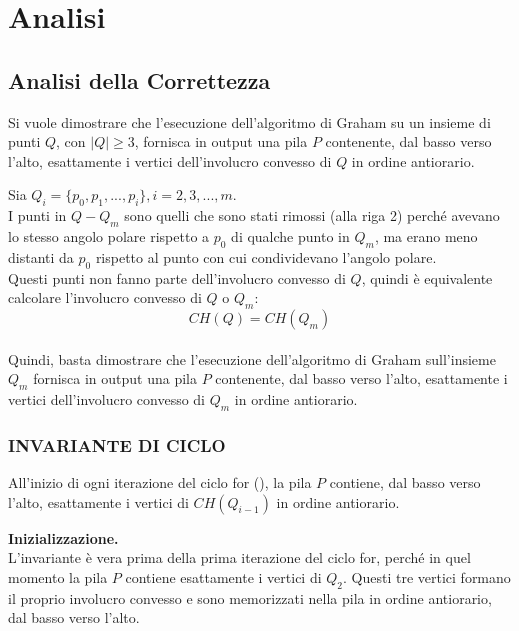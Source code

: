\documentclass[12pt,a4paper]{report}
\begin{document}
\chapter{Analisi}\label{ch:anallisi}

\section{Analisi della Correttezza}\label{ch:correttezza}
Si vuole dimostrare che l'esecuzione dell'algoritmo di Graham su un insieme di punti $Q$, con $|Q| \geq 3$, fornisca in output una pila $P$ contenente, dal basso verso l'alto, esattamente i vertici dell'involucro convesso di $Q$ in ordine antiorario.

\vspace{0.5cm}

\noindent Sia $Q_i = \{ p_0, p_1, ..., p_i \}, i = 2, 3, ..., m$.\\
I punti in $Q - Q_m$ sono quelli che sono stati rimossi (alla riga 2) perché avevano lo stesso angolo polare rispetto a $p_0$ di qualche punto in $Q_m$, ma erano meno distanti da $p_0$ rispetto al punto con cui condividevano l'angolo polare.\\
Questi punti non fanno parte dell'involucro convesso di $Q$, quindi è equivalente calcolare l'involucro convesso di $Q$ o $Q_m$:
\[  CH(Q) = CH(Q_m) \]\\
Quindi, basta dimostrare che l'esecuzione dell'algoritmo di Graham sull'insieme $Q_m$ fornisca in output una pila $P$ contenente, dal basso verso l'alto, esattamente i vertici dell'involucro convesso di $Q_m$ in ordine antiorario.

\subsection*{\small{INVARIANTE DI CICLO}}
All'inizio di ogni iterazione del ciclo for (), la pila $P$ contiene, dal basso verso l'alto, esattamente i vertici di $CH(Q_{i-1})$ in ordine antiorario.

\vspace{0.5cm}

\noindent \textbf{Inizializzazione.}\\
L'invariante è vera prima della prima iterazione del ciclo for, perché in quel momento la pila $P$ contiene esattamente i vertici di $Q_2$. Questi tre vertici formano il proprio involucro convesso e sono memorizzati nella pila in ordine antiorario, dal basso verso l'alto.

\pagebreak
\end{document}

